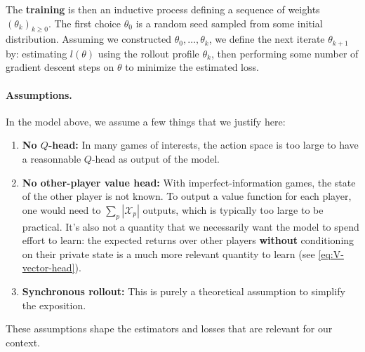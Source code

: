 \documentclass[12pt, a4paper]{article}
\begin{document}
The \textbf{training} is then an inductive process defining a sequence of weights $(\theta_k)_{k \geq 0}$.
The first choice $\theta_0$ is a random seed sampled from some initial distribution.
Assuming we constructed $\theta_0, \ldots, \theta_k$, we define the next iterate $\theta_{k+1}$ by: estimating $l(\theta)$ using the rollout profile $\theta_k$, then performing some number of gradient descent steps on $\theta$ to minimize the estimated loss.

\paragraph{Assumptions.}
In the model above, we assume a few things that we justify here:
\begin{enumerate}
  \item \textbf{No $Q$-head:} In many games of interests, the action space is too large to have a reasonnable $Q$-head as output of the model.
  \item \textbf{No other-player value head:} With imperfect-information games, the state of the other player is not known.
  To output a value function for each player, one would need to $\sum_p |\mathcal{X}_p|$ outputs, which is typically too large to be practical.
  It's also not a quantity that we necessarily want the model to spend effort to learn: the expected returns over other players \textbf{without} conditioning on their private state is a much more relevant quantity to learn (see \autoref{eq:V-vector-head}).
  \item \textbf{Synchronous rollout:} This is purely a theoretical assumption to simplify the exposition.
\end{enumerate}
These assumptions shape the estimators and losses that are relevant for our context.
\end{document}
